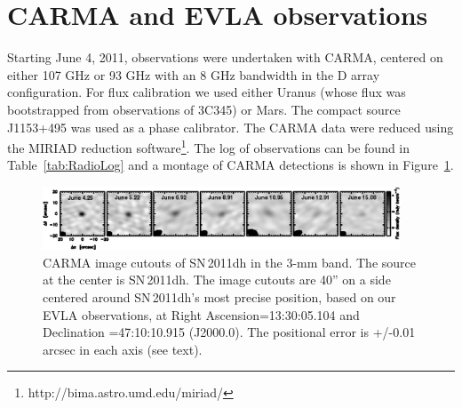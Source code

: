 \documentclass{emulateapj}
\begin{document}
\section{CARMA and EVLA observations}
\label{sec:CARMA-EVLA}


Starting June 4, 2011, observations were
undertaken with CARMA, centered on either 107 GHz or 93 GHz with an 8 GHz
bandwidth in the D array configuration. 
For flux calibration we used either Uranus (whose flux was
bootstrapped from observations of 3C345) or Mars. The compact source
J1153+495 was used as a phase calibrator. The CARMA data were reduced using the MIRIAD reduction
software\footnote{http://bima.astro.umd.edu/miriad/}. 
The log of observations can be found in Table~\ref{tab:RadioLog} and a
montage of CARMA detections is shown in Figure~\ref{fig:CARMAMontage}.


\begin{figure}[!ht] 
\centering
\includegraphics[width=0.95\textwidth]{m51sn_carma_dates.eps}
\caption{
\small 
CARMA image cutouts  of SN\,2011dh in the 3-mm band. The source at the
  center is SN\,2011dh. The image cutouts are 40'' on a side
centered around SN\,2011dh's most precise position, based on our EVLA
observations, at Right Ascension=13:30:05.104 and Declination
=47:10:10.915 (J2000.0). The positional error is +/-0.01 arcsec in
each axis (see text).
}
\label{fig:CARMAMontage}
\end{figure}
 
\end{document}
